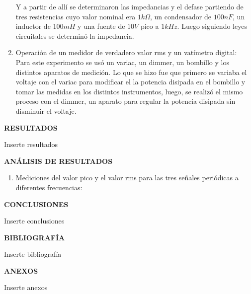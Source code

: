 \documentclass[12pt]{article}
\begin{document}
\begin{enumerate}
		Y a partir de allí se determinaron las impedancias y el defase partiendo de tres resistencias cuyo valor nominal era $1k\Omega$, un condensador de $100nF$, un inductor de $100mH$ y una fuente de $10V$ pico a $1kHz$. Luego siguiendo leyes circuitales se determinó la impedancia.
		
		\item Operación de un medidor de verdadero valor rms y un vatímetro digital:\\
		
		Para este experimento se usó un variac, un dimmer, un bombillo y los distintos aparatos de medición. Lo que se hizo fue que primero se variaba el voltaje con el variac para modificar el la potencia disipada en el bombillo y tomar las medidas en los distintos instrumentos, luego, se realizó el mismo proceso con el dimmer, un aparato para regular la potencia disipada sin disminuir el voltaje.
		
		
	\end{enumerate}
	
	\newpage
	
	\begin{center}
		\textbf{\large RESULTADOS}\\
	\end{center}
	
	Inserte resultados
	
	\newpage
	
	\begin{center}
		\textbf{\large ANÁLISIS DE RESULTADOS}\\
	\end{center}
	
	\renewcommand{\theenumi}{\alph{enumi}} %
	
	\begin{enumerate}
		
		\item Mediciones del valor pico y el valor
		rms para las tres señales periódicas a diferentes frecuencias:
		
	\end{enumerate}
	
	\newpage
	
	\begin{center}
		\textbf{\large CONCLUSIONES}\\
	\end{center}
	
	Inserte conclusiones
	
	\newpage
	
	\begin{center}
		\textbf{\large BIBLIOGRAFÍA}\\
	\end{center}
	
	Inserte bibliografía
	
	\newpage
	
	\begin{center}
		\textbf{\large ANEXOS}\\
	\end{center}
	
	Inserte anexos
	
\end{document}
